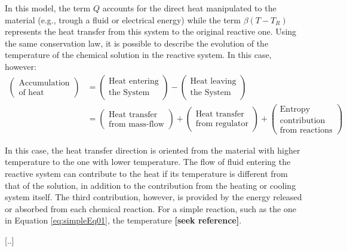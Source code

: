 \documentclass[a4paper,11pt]{book}
\numberwithin{figure}{chapter}
\numberwithin{equation}{chapter}
\numberwithin{table}{chapter}
\theoremstyle{definition}
\begin{document}
In this model, the term $Q$ accounts for the direct heat manipulated to the material (e.g., trough a fluid or electrical energy) while the term $\beta (T - T_R)$ represents the heat transfer from this system to the original reactive one. Using the same conservation law, it is possible to describe the evolution of the temperature of the chemical solution in the reactive system. In this case, however: 
\begin{equation}
\begin{split}
	\begin{pmatrix}
		\text{Accumulation} \\ \text{of heat}
	\end{pmatrix} &= \begin{pmatrix}
		\text{Heat entering} \\ \text{the System}
	\end{pmatrix} - \begin{pmatrix}
		\text{Heat leaving} \\ \text{the System}
	\end{pmatrix} \\
	 &= \begin{pmatrix}
		\text{Heat transfer} \\ \text{from mass-flow}
	\end{pmatrix} + \begin{pmatrix}
		\text{Heat transfer} \\ \text{from regulator}
	\end{pmatrix} + \begin{pmatrix}
		\text{Entropy} \\ \text{contribution} \\ \text{from reactions}
	\end{pmatrix}
\end{split}
\end{equation}

In this case, the heat transfer direction is oriented from the material with higher temperature to the one with lower temperature. The flow of fluid entering the reactive system can contribute to the heat if its temperature is different from that of the solution, in addition to the contribution from the heating or cooling system itself. The third contribution, however, is provided by the energy released or absorbed from each chemical reaction. For a simple reaction, such as the one in Equation \eqref{eq:simpleEq01}, the temperature \textbf{[seek reference]}. 

[..]
\end{document}
